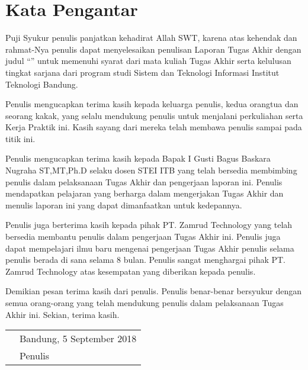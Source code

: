 \chapter*{Kata Pengantar}

Puji Syukur penulis panjatkan kehadirat Allah SWT, karena atas kehendak dan rahmat-Nya penulis dapat menyelesaikan penulisan Laporan Tugas Akhir dengan judul “\thetitle ” untuk memenuhi syarat dari mata kuliah Tugas Akhir serta kelulusan tingkat sarjana dari program studi Sistem dan Teknologi Informasi Institut Teknologi Bandung.

Penulis mengucapkan terima kasih kepada keluarga penulis, kedua orangtua dan seorang kakak, yang selalu mendukung penulis untuk menjalani perkuliahan serta Kerja Praktik ini. Kasih sayang dari mereka telah membawa penulis sampai pada titik ini.

Penulis mengucapkan terima kasih kepada Bapak I Gusti Bagus Baskara Nugraha ST,MT,Ph.D selaku dosen STEI ITB yang telah bersedia membimbing penulis dalam pelaksanaan Tugas Akhir dan pengerjaan laporan ini. Penulis mendapatkan pelajaran yang berharga dalam mengerjakan Tugas Akhir dan menulis laporan ini yang dapat dimanfaatkan untuk kedepannya.

Penulis juga berterima kasih kepada pihak PT. Zamrud Technology yang telah bersedia membantu penulis dalam pengerjaan Tugas Akhir ini. Penulis juga dapat mempelajari ilmu baru mengenai pengerjaan Tugas Akhir penulis selama penulis berada di sana selama 8 bulan. Penulis sangat menghargai pihak PT. Zamrud Technology atas kesempatan yang diberikan kepada penulis.

Demikian pesan terima kasih dari penulis. Penulis benar-benar bersyukur dengan semua orang-orang yang telah mendukung penulis dalam pelaksanaan Tugas Akhir ini. Sekian, terima kasih.

\vspace{15mm}
\begin{tabularx}{\textwidth}{l@{\hskip 0.5\textwidth}l}
    & Bandung, 5 September 2018\\
    & Penulis
\end{tabularx}